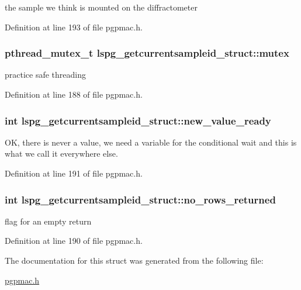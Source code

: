 the sample we think is mounted on the diffractometer 



Definition at line 193 of file pgpmac.\-h.

\hypertarget{structlspg__getcurrentsampleid__struct_ace54acbdcbce620437962858ba04e256}{
\subsubsection[{mutex}]{\setlength{\rightskip}{0pt plus 5cm}pthread\-\_\-mutex\-\_\-t lspg\-\_\-getcurrentsampleid\-\_\-struct\-::mutex}}\label{structlspg__getcurrentsampleid__struct_ace54acbdcbce620437962858ba04e256}


practice safe threading 



Definition at line 188 of file pgpmac.\-h.

\hypertarget{structlspg__getcurrentsampleid__struct_ada3840f03195ee1807150f1e75fd3775}{
\subsubsection[{new\-\_\-value\-\_\-ready}]{\setlength{\rightskip}{0pt plus 5cm}int lspg\-\_\-getcurrentsampleid\-\_\-struct\-::new\-\_\-value\-\_\-ready}}\label{structlspg__getcurrentsampleid__struct_ada3840f03195ee1807150f1e75fd3775}


O\-K, there is never a value, we need a variable for the conditional wait and this is what we call it everywhere else. 



Definition at line 191 of file pgpmac.\-h.

\hypertarget{structlspg__getcurrentsampleid__struct_a06758730db55730eb10d2d63e2520d71}{
\subsubsection[{no\-\_\-rows\-\_\-returned}]{\setlength{\rightskip}{0pt plus 5cm}int lspg\-\_\-getcurrentsampleid\-\_\-struct\-::no\-\_\-rows\-\_\-returned}}\label{structlspg__getcurrentsampleid__struct_a06758730db55730eb10d2d63e2520d71}


flag for an empty return 



Definition at line 190 of file pgpmac.\-h.



The documentation for this struct was generated from the following file\-:\begin{DoxyCompactItemize}
\item 
\hyperlink{pgpmac_8h}{pgpmac.\-h}\end{DoxyCompactItemize}
